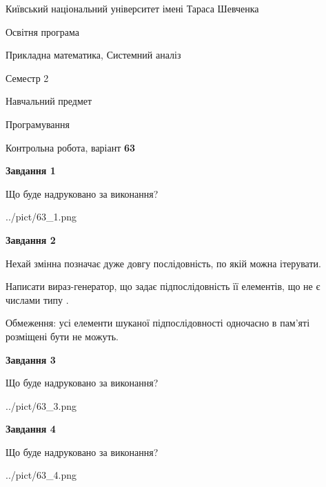 \documentclass[12pt, ukrainian]{article}
\begin{document}
{{\begin {small}\par
{ \center  Київський національний університет імені Тараса Шевченка \par}
{\parbox {5 cm}{Освітня програма \hfill}{\parbox {8 cm}{Прикладна математика, Системний аналіз \hfill}}\parbox {5 cm}{\hfill Семестр 2}}\par
{\parbox {5 cm} {Навчальний предмет \hfill}\parbox {7 cm}{Програмування \hfill}\parbox {6cm}{\hfill}\par}\vspace{-7pt} \end{small}}{\center Контрольна робота, варіант  \No \textbf
{ 63 }\par}}
{
\begin {large}
{\begin {center}\textbf{Завдання 1}\end {center}}\par
Що буде надруковано за виконання?\par\par
\begin{center}
	{../pict/63_1.png}
\end{center}
\newpage

{\begin {center}\textbf{Завдання 2}\end {center}}\par
Нехай змінна  позначає дуже довгу послідовність, по якій можна ітерувати.

Написати вираз-генератор, що задає підпослідовність її елементів, що не є числами типу .

Обмеження: усі елементи шуканої підпослідовності одночасно в пам'яті розміщені бути не можуть.\par
\newpage

{\begin {center}\textbf{Завдання 3}\end {center}}\par
Що буде надруковано за виконання?
\begin{center}
	{../pict/63_3.png}
\end{center}
\newpage

{\begin {center}\textbf{Завдання 4}\end {center}}\par
Що буде надруковано за виконання?\par
\begin{center}
	{../pict/63_4.png}
\end{center}
\newpage


\end{large}}
\end{document}
